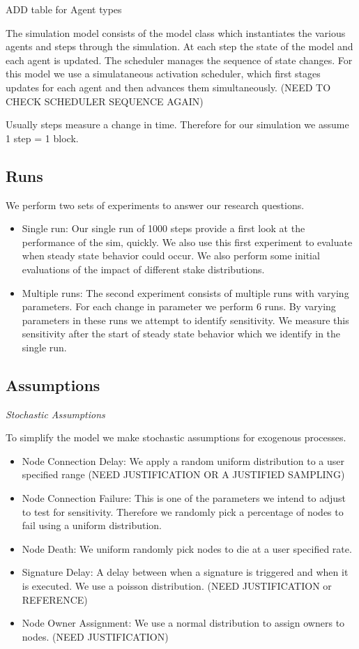 \documentclass[conference]{IEEEtran}
\begin{document}
ADD table for Agent types

The simulation model consists of the model class which instantiates the various agents
and steps through the simulation. At each step the state of the model and each agent
is updated. The scheduler manages the sequence of state changes. For this model we use
a simulataneous activation scheduler, which first stages updates for each agent and then 
advances them simultaneously.  (NEED TO CHECK SCHEDULER SEQUENCE AGAIN)

Usually steps measure a change in time. Therefore for our simulation we assume
1 step = 1 block.

\subsection{Runs}
We perform two sets of experiments to answer our research questions. 
\begin{itemize}

\item Single run: Our single run of 1000 steps provide a first look at the 
performance of the sim, quickly. We also use this first experiment to evaluate
when steady state behavior could occur. We also perform some initial evaluations
of the impact of different stake distributions.

\item Multiple runs: The second experiment consists of multiple runs with varying 
parameters. For each change in parameter we perform 6 runs. By varying parameters 
in these runs we attempt to identify sensitivity. We measure this sensitivity after
the start of steady state behavior which we identify in the single run. 
    
\end{itemize}

\subsection{Assumptions}

\textit{Stochastic Assumptions}

To simplify the model we make stochastic assumptions for exogenous processes.

\begin{itemize}

\item Node Connection Delay: We apply a random uniform distribution to a user specified range (NEED JUSTIFICATION OR A JUSTIFIED SAMPLING)
\item Node Connection Failure: This is one of the parameters we intend to adjust to test for sensitivity. Therefore we
randomly pick a percentage of nodes to fail using a uniform distribution.
\item Node Death: We uniform randomly pick nodes to die at a user specified rate.
\item Signature Delay: A delay between when a signature is triggered and when it is executed. We use a poisson distribution. (NEED JUSTIFICATION or REFERENCE)
\item Node Owner Assignment: We use a normal distribution to assign owners to nodes. (NEED JUSTIFICATION)
\end{itemize}
\end{document}
